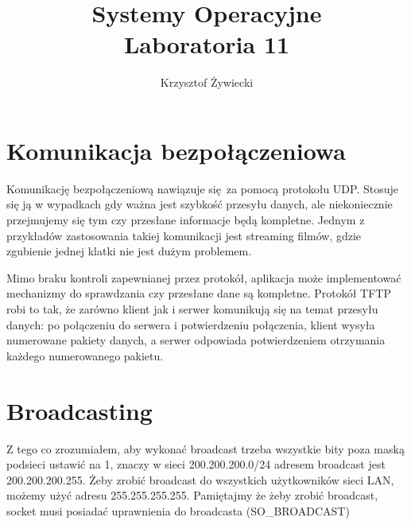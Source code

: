 \documentclass[a4paper, 11pt]{article}
\title{Systemy Operacyjne\\
	\Large{Laboratoria 11}}
\author{Krzysztof Żywiecki}
\begin{document}
	
	\maketitle
	
	\section*{Komunikacja bezpołączeniowa}
	Komunikację bezpołączeniową nawiązuje się za pomocą protokołu UDP. Stosuje się ją w wypadkach gdy ważna jest szybkość przesyłu danych, ale niekoniecznie przejmujemy się tym czy przesłane informacje będą kompletne. Jednym z przykładów zastosowania takiej komunikacji jest streaming filmów, gdzie zgubienie jednej klatki nie jest dużym problemem.
	
	Mimo braku kontroli zapewnianej przez protokół, aplikacja może implementować mechanizmy do sprawdzania czy przesłane dane są kompletne. Protokół TFTP robi to tak, że zarówno klient jak i serwer komunikują się na temat przesyłu danych: po połączeniu do serwera i potwierdzeniu połączenia, klient wysyła numerowane pakiety danych, a serwer odpowiada potwierdzeniem otrzymania każdego numerowanego pakietu. 
	
	\section*{Broadcasting}
	Z tego co zrozumiałem, aby wykonać broadcast trzeba wszystkie bity poza maską podsieci ustawić na 1, znaczy w sieci 200.200.200.0/24 adresem broadcast jest 200.200.200.255. Żeby zrobić broadcast do wszystkich użytkowników sieci LAN, możemy użyć adresu 255.255.255.255. Pamiętajmy że żeby zrobić broadcast, socket musi posiadać uprawnienia do broadcasta (SO\_BROADCAST)
	
\end{document}
